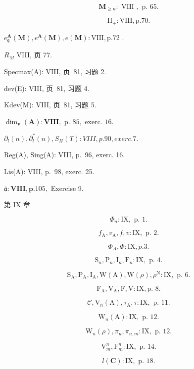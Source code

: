 \[
\mathbf {M} _ {\geqslant n}: \text { VIII }, \text { p. } 65.
\]

\[
\mathrm{H} _ {+}: \text {VIII}, \text {p.} 70.
\]

\(e_{\mathfrak{q}}^{\mathbf{A}}(\mathbf{M}), e^{\mathbf{A}}(\mathbf{M}), e(\mathbf{M}) : \mathrm{VIII}, \mathrm{p.72}\) .

\(R_{M}\) VIII, 页 77.

Specmax(A): VIII, 页~81, 习题 2.

dev(E): VIII, 页~81, 习题 4.

Kdev(M): VIII, 页~81, 习题 5.

\(\dim_{\mathbf{v}}(\mathbf{A}) : \mathbf{VIII}, \text{ p. } 85, \text{ exerc. } 16.\)

\(\partial_l(n), \partial_l^*(n), S_H(T): VIII, p. 90, exerc. 7.\)

Reg(A), Sing(A): VIII, p.~96, exerc. 16.

Lis(A): VIII, p.~98, exerc. 25.

\(\overline{\mathfrak{a}}:\mathbf{V}\mathbf{I}\mathbf{I}\mathbf{I}\mathbf{,}\mathbf{p.}105,\) Exercise 9.

第 IX 章

\[
\Phi_ {n}: \mathrm{IX}, \text { p. } 1.
\]

\[
f _ {\mathrm{A}}, v _ {\mathrm{A}}, f, v: \mathrm{IX}, \text { p. } 2.
\]

\[
\Phi_ {A}, \Phi : \mathrm{IX}, p. 3.
\]

\[
\mathrm{S} _ {n}, \mathrm{P} _ {n}, \mathrm{I} _ {n}, \mathrm{F} _ {n}: \mathrm{IX}, \text { p. } 4.
\]

\[
\mathrm{S} _ {\mathrm{A}}, \mathrm{P} _ {\mathrm{A}}, \mathrm{I} _ {\mathrm{A}}, \mathrm{W} (\mathrm{A}), \mathrm{W} (\rho), \rho^ {\mathrm{N}}: \mathrm{IX}, \text { p. } 6.
\]

\[
\mathrm{F} _ {\mathrm{A}}, \mathrm{V} _ {\mathrm{A}}, \mathrm{F}, \mathrm{V}: \mathrm{IX}, \text {p. 8.}
\]

\[
\mathcal {C}, \mathrm{V} _ {n} (\mathrm{A}), \tau_ {\mathrm{A}}, \tau : \mathrm{IX}, \text { p. } 11.
\]

\[
\mathrm{W} _ {n} (\mathrm{A}): \mathrm{IX}, \text { p. } 12.
\]

\[
\mathrm{W} _ {n} (\rho), \pi_ {n}, \pi_ {n, m}: \mathrm{IX}, \text { p. } 12.
\]

\[
\mathrm{V} _ {m} ^ {n}, \mathrm{F} _ {m} ^ {n}: \mathrm{IX}, \text { p. } 14.
\]

\[
l (\mathbf {C}): \mathrm{IX}, \text { p. } 18.
\]

